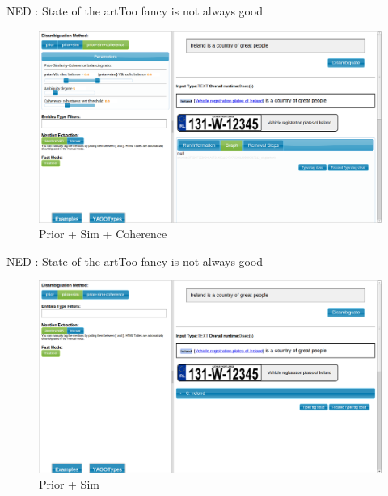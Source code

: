 \documentclass{beamer}
\begin{document}
\begin{frame}{NED : State of the art}{Too fancy is not always good}
\begin{figure}[h]
 \centering
 \includegraphics[bb=0 0 1366 768,scale=0.23]{./prior1.png}
 \caption{Prior + Sim + Coherence}
\end{figure}
\end{frame}
\begin{frame}{NED : State of the art}{Too fancy is not always good}
\begin{figure}[h]
 \centering
 \includegraphics[bb=0 0 1366 768,scale=0.23]{./prior2.png}
 \caption{Prior + Sim}
\end{figure}
\end{frame}
\end{document}
